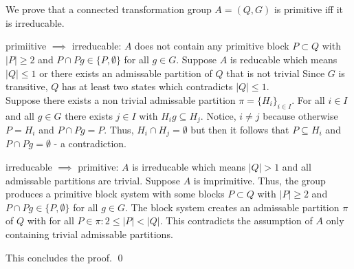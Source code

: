 \documentclass[a4paper,12pt,numbers=noenddot]{scrreport}
\begin{document}

\chapter{}
\section{}
We prove that a connected transformation group $A=(Q,G)$ is primitive iff it is irreducable.

primiitive $\implies$ irreducable: $A$ does not contain any primitive block $P \subset Q$ with $|P| \geq 2$
and $P \cap Pg \in \{P, \emptyset \}$ for all $g \in G$.
Suppose $A$ is reducable which means $|Q| \leq 1$ or there exists an admissable partition of $Q$ that is not trivial
Since $G$ is transitive, $Q$ has at least two states which contradicts $|Q| \leq 1$.\\
Suppose there exists a non trivial admissable partition $\pi = \{H_i\}_{i \in I}$.
For all $i \in I$ and all $g \in G$ there exists $j \in I$ with $H_ig \subseteq H_j$.
Notice, $i \neq j$ because otherwise $P = H_i$ and $P \cap Pg = P$.
Thus, $H_i \cap H_j = \emptyset$ but then it follows that $P \subseteq H_i$ and $P \cap Pg = \emptyset$ - a contradiction.

irreducable $\implies$ primitive: $A$ is irreducable which means $|Q| > 1$ and all admissable partitions are trivial.
Suppose $A$ is imprimitive.
Thus, the group produces a primitive block system with some blocks $P \subset Q$ with $|P| \geq 2$ and $P \cap Pg \in \{P, \emptyset\}$ for all $g \in G$.
The block system creates an admissable partition $\pi$ of $Q$ with for all $P \in \pi: 2 \leq |P| < |Q|$.
This contradicts the assumption of $A$ only containing trivial admissable partitions.
\vspace{1cm}

This concludes the proof. \qed

\section{}
\section{}
\section{}
\end{document}
